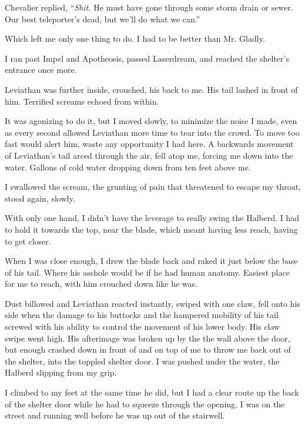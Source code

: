Chevalier replied, ``\emph{Shit.} He must have gone through some storm drain or sewer.  Our best teleporter's dead, but we'll do what we can.''



Which left me only one thing to do.  I had to be better than Mr. Gladly.



I ran past Impel and Apotheosis, passed Laserdream, and reached the shelter's entrance once more.



Leviathan was further inside, crouched, his back to me.  His tail lashed in front of him.  Terrified screams echoed from within.



It was agonizing to do it, but I moved slowly, to minimize the noise I made, even as every second allowed Leviathan more time to tear into the crowd.  To move too fast would alert him, waste any opportunity I had here.  A backwards movement of Leviathan's tail arced through the air, fell atop me, forcing me down into the water.  Gallons of cold water dropping down from ten feet above me.



I swallowed the scream, the grunting of pain that threatened to escape my throat, stood again, slowly.



With only one hand, I didn't have the leverage to really swing the Halberd.  I had to hold it towards the top, near the blade, which meant having less reach, having to get closer.



When I was close enough, I drew the blade back and raked it just below the base of his tail.  Where his asshole would be if he had human anatomy.  Easiest place for me to reach, with him crouched down like he was.



Dust billowed and Leviathan reacted instantly, swiped with one claw, fell onto his side when the damage to his buttocks and the hampered mobility of his tail screwed with his ability to control the movement of his lower body.  His claw swipe went high.  His afterimage was broken up by the the wall above the door, but enough crashed down in front of and on top of me to throw me back out of the shelter, into the toppled shelter door.  I was pushed under the water, the Halberd slipping from my grip.



I climbed to my feet at the same time he did, but I had a clear route up the back of the shelter door while he had to squeeze through the opening.  I was on the street and running well before he was up out of the stairwell.



